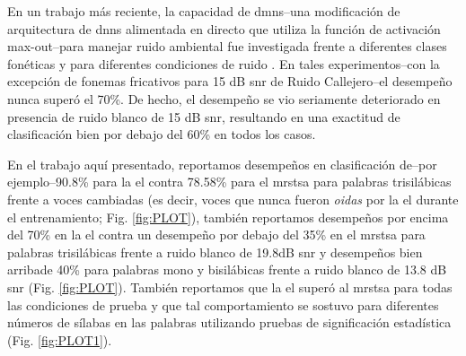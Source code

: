 {En un trabajo más reciente, la capacidad de \glspl{dmn}--una modificación de arquitectura de \glspl{dnn} alimentada en directo que utiliza la función de activación max-out--para manejar ruido ambiental fue investigada frente a diferentes clases fonéticas y para diferentes condiciones de ruido \cite{silos_2016}. En tales experimentos--con la excepción de fonemas fricativos para 15 dB \gls{snr} de Ruido Callejero--el desempeño nunca superó el 70\%. De hecho, el desempeño se vio seriamente deteriorado en presencia de ruido blanco de 15 dB \gls{snr}, resultando en una exactitud de clasificación bien por debajo del 60\% en todos los casos.

En el trabajo aquí presentado, reportamos desempeños en clasificación de--por ejemplo--90.8\% para la \gls{el} contra 78.58\% para el \gls{mrstsa} para palabras trisilábicas frente a voces cambiadas (es decir, voces que nunca fueron \emph{oidas} por la \gls{el} durante el entrenamiento; Fig. \ref{fig:PLOT}), también reportamos desempeños por encima del 70\% en la \gls{el} contra un desempeño por debajo del 35\% en el \gls{mrstsa} para palabras trisilábicas frente a ruido blanco de 19.8dB \gls{snr} y desempeños bien arribade 40\% para palabras mono y bisilábicas frente a ruido blanco de 13.8 dB \gls{snr} (Fig. \ref{fig:PLOT}). También reportamos que la \gls{el} superó al \gls{mrstsa} para todas las condiciones de prueba y que tal comportamiento se sostuvo para diferentes números de sílabas en las palabras utilizando pruebas de significación estadística (Fig. \ref{fig:PLOT1}).

}
